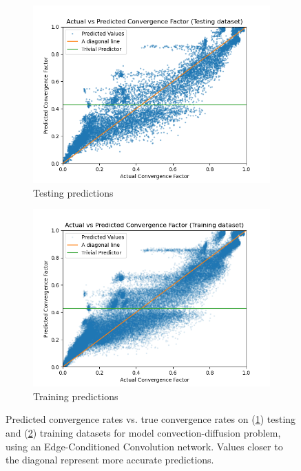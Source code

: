 \documentclass[review]{siamart190516}
\begin{document}
\begin{figure}[h]
  \centering
  \begin{subfigure}{.48\textwidth}
    \includegraphics[width=\textwidth]{figs/cd_var_conv_mpnn_test_pred.png}
    \caption{Testing predictions}
    \label{subfig:cd_mpnn_test}
  \end{subfigure}
  \begin{subfigure}{.48\textwidth}
    \includegraphics[width=\textwidth]{figs/cd_var_conv_mpnn_train_pred.png}
    \caption{Training predictions}
    \label{subfig:cd_mpnn_train}
  \end{subfigure}
  \caption{Predicted convergence rates vs. true convergence rates on (\ref{subfig:cd_mpnn_test}) testing and (\ref{subfig:cd_mpnn_train}) training datasets for model convection-diffusion problem, using an Edge-Conditioned Convolution network. Values closer to the diagonal represent more accurate predictions. }
  \label{fig:cd_mpnn_pred}
\end{figure}
\end{document}
